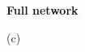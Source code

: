 \begin{figure*}[tb]
  \centering
  \begin{minipage}[t]{0.49\linewidth}
    \centering
    \textbf{Full network}








    \begin{flushleft}
      \vspace{1ex}
      (c)
    \end{flushleft}


\end{minipage}
\end{figure*}
